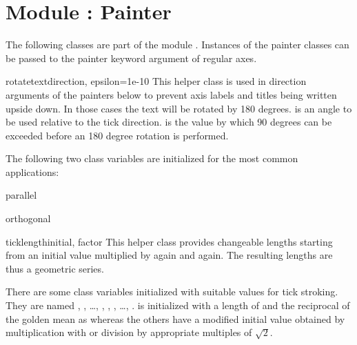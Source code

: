 \section{Module : Painter} %


The following classes are part of the module
. Instances of the painter classes can be
passed to the painter keyword argument of regular axes.

\begin{classdesc}{rotatetext}{direction, epsilon=1e-10}
  This helper class is used in direction arguments of the painters
  below to prevent axis labels and titles being written upside down.
  In those cases the text will be rotated by 180 degrees.
   is an angle to be used relative to the tick
  direction.  is the value by which 90 degrees can be
  exceeded before an 180 degree rotation is performed.
\end{classdesc}

The following two class variables are initialized for the most common
applications:

\begin{memberdesc}{parallel}
\end{memberdesc}

\begin{memberdesc}{orthogonal}
\end{memberdesc}

\begin{classdesc}{ticklength}{initial, factor}
  This helper class provides changeable \PyX{} lengths starting from
  an initial value  multiplied by  again and
  again. The resulting lengths are thus a geometric series.
\end{classdesc}

There are some class variables initialized with suitable values for
tick stroking. They are named ,
, \dots, ,
, , \dots,
.  is initialized with
a length of  and the reciprocal of the golden mean as
 whereas the others have a modified initial value
obtained by multiplication with or division by appropriate multiples of 
$\sqrt{2}$.

